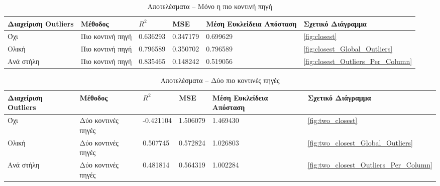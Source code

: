 \begin{table}[h!]
\centering
\small
\caption{Αποτελέσματα – Μόνο η πιο κοντινή πηγή}
\label{tab:closest_data}
\begin{tabularx}{\textwidth}{|
    >{\raggedright\arraybackslash}p{3cm} |
    >{\raggedright\arraybackslash}p{3cm} |
    X | X | X | X |}
\hline
\toprule
\textbf{Διαχείριση Outliers} & 
\textbf{Μέθοδος} &
\textbf{$R^2$} &
\textbf{MSE} &
\textbf{Μέση Ευκλείδεια Απόσταση} &
\textbf{Σχετικό Διάγραμμα} \\
\midrule
Όχι        & Πιο κοντινή πηγή & 0.636293 & 0.347179 & 0.699629 & \autoref{fig:closest} \\
Ολική      & Πιο κοντινή πηγή & 0.796589 & 0.350702 & 0.796589 & \autoref{fig:closest_Global_Outliers} \\
Ανά στήλη  & Πιο κοντινή πηγή & 0.835465 & 0.148242 & 0.519056 & \autoref{fig:closest_Outliers_Per_Column} \\
\bottomrule
\end{tabularx}
\end{table}

\begin{table}[h!]
\centering
\caption{Αποτελέσματα – Δύο πιο κοντινές πηγές}
\label{tab:second_closest_data}
\begin{tabularx}{\textwidth}{|
    >{\raggedright\arraybackslash}p{3cm} |
    >{\raggedright\arraybackslash}p{3cm} |
    X | X | X | X |}
\hline
\toprule
\textbf{Διαχείριση Outliers} & 
\textbf{Μέθοδος} &
\textbf{$R^2$} &
\textbf{MSE} &
\textbf{Μέση Ευκλείδεια Απόσταση} &
\textbf{Σχετικό Διάγραμμα} \\
\midrule
Όχι        & Δύο κοντινές πηγές & -0.421104 & 1.506079 & 1.469430 & \autoref{fig:two_closest} \\
Ολική      & Δύο κοντινές πηγές & 0.507745  & 0.572824 & 1.026803 & \autoref{fig:two_closest_Global_Outliers} \\
Ανά στήλη  & Δύο κοντινές πηγές & 0.481814  & 0.564319 & 1.002284 & \autoref{fig:two_closest_Outliers_Per_Column} \\
\bottomrule
\end{tabularx}
\end{table}